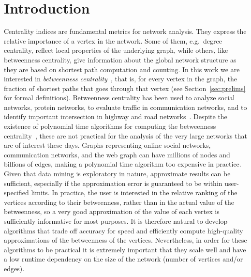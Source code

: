 \section{Introduction}\label{sec:intro}
Centrality indices are fundamental metrics for network analysis. They express the
relative importance of a vertex in the network. Some of them, e.g.~degree
centrality, reflect local properties of the underlying graph, while others,
like betweenness centrality, give information about the global network structure
as they are based on shortest path computation and counting\citep{Newman10}. In
this work we are interested in \emph{betweenness
centrality}~\citep{Anthonisse71,Freeman77}, that is, for every vertex in the
graph, the fraction of shortest paths that goes through that vertex (see
Section~\ref{sec:prelims} for formal definitions). Betweenness centrality has
been used to analyze social networks, protein networks, to evaluate traffic in
communication networks, and to identify important intersection in highway and
road networks~\citep{Newman10,GeisbergerSS08}. Despite the existence of
polynomial time algorithms for computing the betweenness
centrality~\citep{Brandes01}, these are not practical for the analysis of the
very large networks that are of interest these days. Graphs representing online
social networks, communication networks, and the web graph can have millions of
nodes and billions of edges, making a polynomial time algorithm too expensive in
practice. Given that data mining is exploratory in nature, approximate results
can be sufficient, especially if the approximation error is guaranteed to be
within user-specified limits. In practice, the user is interested in the
relative ranking of the vertices according to their betweenness, rather than in
the actual value of the betweenness, so a very good approximation of the value
of each vertex is sufficiently informative for most purposes. It is therefore
natural to develop algorithms that trade off accuracy for speed and efficiently 
compute high-quality approximations of the betweenness of the vertices.
Nevertheless, in order for these algorithms to be practical it is extremely
important that they scale well and have a low runtime dependency on the size of
the network (number of vertices and/or edges).

